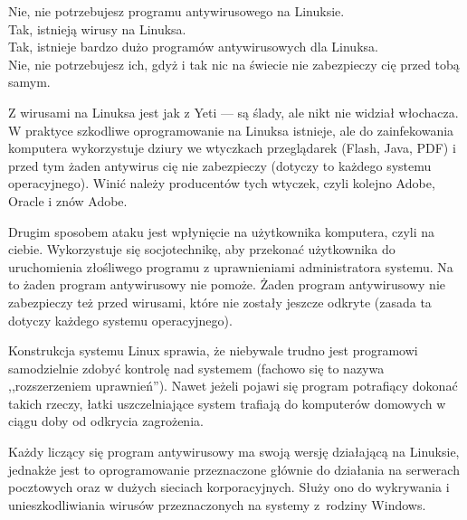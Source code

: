 \noindent \textcolor{ubuntu_orange}{Nie}, nie potrzebujesz programu antywirusowego na Linuksie.\\
\textcolor{ubuntu_orange}{Tak}, istnieją wirusy na Linuksa.\\
\textcolor{ubuntu_orange}{Tak}, istnieje bardzo dużo programów antywirusowych dla Linuksa.\\
\textcolor{ubuntu_orange}{Nie}, nie potrzebujesz ich, gdyż i tak nic na świecie nie zabezpieczy cię przed tobą samym.

Z wirusami na Linuksa jest jak z Yeti --- są ślady, ale nikt nie widział włochacza. W praktyce szkodliwe oprogramowanie na Linuksa istnieje, ale do zainfekowania komputera wykorzystuje dziury we wtyczkach przeglądarek (Flash, Java, PDF) i przed tym żaden antywirus cię nie zabezpieczy (dotyczy to każdego systemu operacyjnego). Winić należy producentów tych wtyczek, czyli kolejno Adobe, Oracle i znów Adobe.

Drugim sposobem ataku jest wpłynięcie na użytkownika komputera, czyli na ciebie. Wykorzystuje się socjotechnikę, aby przekonać użytkownika do uruchomienia złośliwego programu z uprawnieniami administratora systemu. Na to żaden program antywirusowy nie pomoże. Żaden program antywirusowy nie zabezpieczy też przed wirusami, które nie zostały jeszcze odkryte (zasada ta dotyczy każdego systemu operacyjnego).

Konstrukcja systemu Linux sprawia, że niebywale trudno jest programowi samodzielnie zdobyć kontrolę nad systemem (fachowo się to nazywa ,,rozszerzeniem uprawnień''). Nawet jeżeli pojawi się program potrafiący dokonać takich rzeczy, łatki uszczelniające system trafiają do komputerów domowych w ciągu doby od odkrycia zagrożenia.

Każdy liczący się program antywirusowy ma swoją wersję działającą na Linuksie, jednakże jest to oprogramowanie przeznaczone głównie do działania na serwerach pocztowych oraz w dużych sieciach korporacyjnych. Służy ono do wykrywania i unieszkodliwiania wirusów przeznaczonych na systemy z~rodziny Windows.


